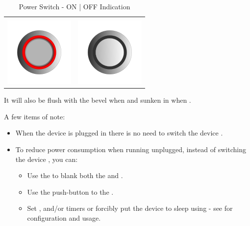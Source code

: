 \begin{table}[H]
\centering
\begin{tabu} to 7cm { X[1,c,m] X[1,c,m] }
   &  \\
  \includegraphics{images/onoff_on.png} & \includegraphics{images/onoff_off.png} \\
\end{tabu}
\caption{Power Switch - ON | OFF Indication}
\end{table}

It will also be flush with the bevel when  and sunken in when .

\par\medskip

A few items of note:

\begin{itemize}
  \item When the device is plugged in there is no need to switch the device
    .
  \item To reduce power consumption when running unplugged, instead of switching
    the device , you can:
    \begin{itemize}
      \item Use the \hyperref[Brightness Knob]{} to blank both the
        \hyperref[Display]{} and \hyperref[Lighting]{}.
      \item Use the \hyperref[Play|Pause|Stop]{} push-button to 
        the \hyperref[Audio]{}.
      \item Set ,  and/or  timers or forcibly put the
        device to sleep using  - see \hyperref[Power Settings]{}
        for configuration and usage.
    \end{itemize}
\end{itemize}

